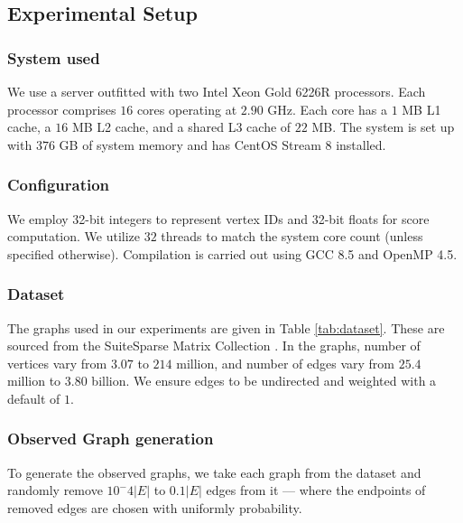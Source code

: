 \subsection{Experimental Setup}
\label{sec:setup}

\subsubsection{System used}

We use a server outfitted with two Intel Xeon Gold 6226R processors. Each processor comprises $16$ cores operating at $2.90$ GHz. Each core has a $1$ MB L1 cache, a $16$ MB L2 cache, and a shared L3 cache of $22$ MB. The system is set up with $376$ GB of system memory and has CentOS Stream 8 installed.\ok{}


\subsubsection{Configuration}

We employ 32-bit integers to represent vertex IDs and 32-bit floats for score computation. We utilize $32$ threads to match the system core count (unless specified otherwise). Compilation is carried out using GCC 8.5 and OpenMP 4.5.\ok{}


\subsubsection{Dataset}

The graphs used in our experiments are given in Table \ref{tab:dataset}. These are sourced from the SuiteSparse Matrix Collection \cite{suite19}. In the graphs, number of vertices vary from $3.07$ to $214$ million, and number of edges vary from $25.4$ million to $3.80$ billion. We ensure edges to be undirected and weighted with a default of $1$.


\subsubsection{Observed Graph generation}

To generate the observed graphs, we take each graph from the dataset and randomly remove $10^-4|E|$ to $0.1|E|$ edges from it --- where the endpoints of removed edges are chosen with uniformly probability.


